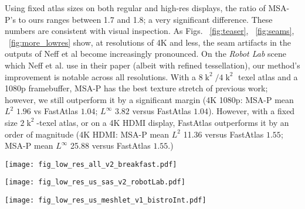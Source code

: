 Using fixed atlas sizes on both regular and high-res displays, the ratio of MSA-P's \FLIP to ours ranges between 1.7 and 1.8; a very significant difference. These numbers are consistent with visual inspection. As Figs. ~\ref{fig:teaser}, ~\ref{fig:seams}, ~\ref{fig:more_lowres} show, at resolutions of 4K and less, the seam artifacts in the outputs of Neff et al become increasingly pronounced. On the {\em Robot Lab} scene which Neff et al. use in their paper (albeit with refined tessellation), our method's improvement is notable across all resolutions. With a $8\operatorname{k}^{2}/4\operatorname{k}^{2}$ texel atlas and a 1080p framebuffer, MSA-P has the best texture stretch of previous work; however, we still outperform it by a significant margin (4K 1080p: MSA-P mean $L^2$ $1.96$ vs FastAtlas $1.04$; $L^\infty$ $3.82$ versus FastAtlas $1.04$). However, with a fixed size $2\operatorname{k}^2$-texel atlas, or on a 4K HDMI display, FastAtlas outperforms it by an order of magnitude (4K HDMI: MSA-P mean $L^2$ 11.36 versus FastAtlas $1.55$; MSA-P mean $L^\infty$ 25.88 versus FastAtlas $1.55$.)

\begin{figure*}
\texttt{[image: fig\_low\_res\_all\_v2\_breakfast.pdf]}
\caption{Additional comparisons with prior art ($2K \times 2K$ atlases). Left to right:  forward render, static atlasing, SAS \cite{mueller2018shading}, MSA  \cite{Neff2022MSA}, FastAtlas. While all prior method outputs exhibit notable undersampling, our results remain visually close to forward rendering.}
\label{fig:more_lowres}
\end{figure*}

\begin{figure*}
\texttt{[image: fig\_low\_res\_us\_sas\_v2\_robotLab.pdf]}
\caption{Additional comparisons with SAS \cite{mueller2018shading}  using $4K \times 4K$ atlases. Left to right: forward render, SAS \cite{mueller2018shading}, FastAtlas. While SAS outputs exhibit notable undersampling and smudging artifacts, our results remain visually close to forward rendering. }
\label{fig:more_lowres_sas}
\end{figure*}

\begin{figure*}
\texttt{[image: fig\_low\_res\_us\_meshlet\_v1\_bistroInt.pdf]}
\caption{Additional comparisons with MSA \cite{Neff2022MSA}  using $2K \times 2K$ atlases. Left to right: forward render, MSA-P \cite{Neff2022MSA}, FastAtlas. While MSA outputs exhibit notable undersampling and seam artifacts, our results remain visually close to forward rendering. }
\label{fig:more_lowres_meshlet}
\end{figure*}


